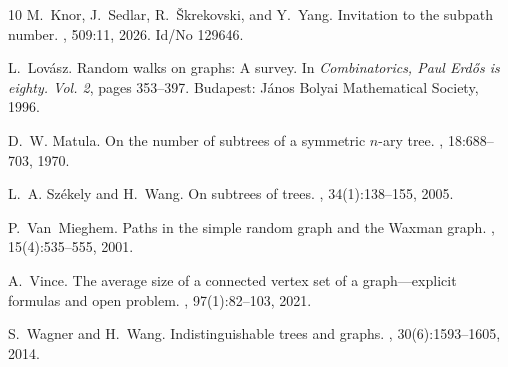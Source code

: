 \documentclass[a4paper,11pt]{article}
\begin{document}
\begin{thebibliography}{10}
M.~Knor, J.~Sedlar, R.~{\v{S}}krekovski, and Y.~Yang.
\newblock Invitation to the subpath number.
, 509:11, 2026.
\newblock Id/No 129646.

L.~Lov{\'a}sz.
\newblock Random walks on graphs: {A} survey.
\newblock In {\em Combinatorics, Paul Erd\H{o}s is eighty. Vol. 2}, pages 353--397. Budapest: J{\'a}nos Bolyai Mathematical Society, 1996.

D.~W. Matula.
\newblock On the number of subtrees of a symmetric {{\(n\)}}-ary tree.
, 18:688--703, 1970.

L.~A. Sz{\'e}kely and H.~Wang.
\newblock On subtrees of trees.
, 34(1):138--155, 2005.

P.~Van~Mieghem.
\newblock Paths in the simple random graph and the {Waxman} graph.
, 15(4):535--555, 2001.

A.~Vince.
\newblock The average size of a connected vertex set of a graph---explicit formulas and open problem.
, 97(1):82--103, 2021.

S.~Wagner and H.~Wang.
\newblock Indistinguishable trees and graphs.
, 30(6):1593--1605, 2014.

\end{thebibliography}
\end{document}
